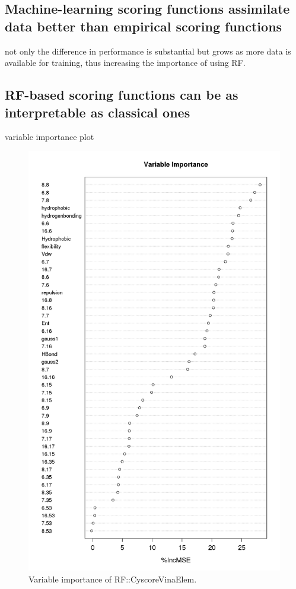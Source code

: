 \documentclass[journal=jacsat,manuscript=article]{achemso}
\begin{document}
\subsection{Machine-learning scoring functions assimilate data better than empirical scoring functions}

not only the difference in performance is substantial but grows as more data is available for training, thus increasing the importance of using RF.

\subsection{RF-based scoring functions can be as interpretable as classical ones}

variable importance plot

\begin{figure}
\includegraphics[width=0.8\linewidth,natwidth=960,natheight=1600]{../rfcyscore/x46/rf/trn-2280.png}
\caption{Variable importance of RF::CyscoreVinaElem.}
\label{fig:varimp}
\end{figure}
\end{document}
